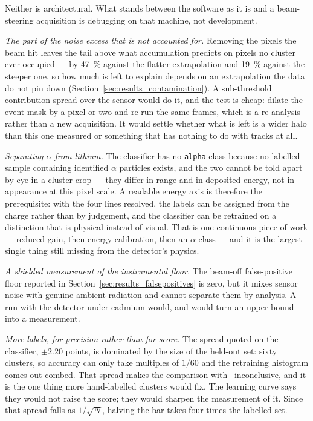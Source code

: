 \documentclass[a4paper,headsepline,oneside,11pt]{scrartcl}
\begin{document}
Neither is architectural. What stands between the software as it is and a
beam-steering acquisition is debugging on that machine, not development.

\emph{The part of the noise excess that is not accounted for.} Removing the
pixels the beam hit leaves the tail above what accumulation predicts on pixels
no cluster ever occupied --- by \SI{47}{\percent} against the flatter
extrapolation and \SI{19}{\percent} against the steeper one, so how much is
left to explain depends on an extrapolation the data do not pin down
(Section~\ref{sec:results_contamination}). A sub-threshold contribution spread
over the sensor would do it, and the test is cheap: dilate the event mask by a
pixel or two and re-run the same frames, which is a re-analysis rather than a
new acquisition. It would settle whether what is left is a wider halo than this
one measured or something that has nothing to do with tracks at all.

\emph{Separating $\alpha$ from lithium.} The classifier has no \texttt{alpha}
class because no labelled sample containing identified $\alpha$ particles
exists, and the two cannot be told apart by eye in a cluster crop --- they differ
in range and in deposited energy, not in appearance at this pixel scale. A
readable energy axis is therefore the prerequisite: with the four lines
resolved, the labels can be assigned from the charge rather than by judgement,
and the classifier can be retrained on a distinction that is physical instead of
visual. That is one continuous piece of work --- reduced gain, then energy
calibration, then an $\alpha$ class --- and it is the largest single thing still
missing from the detector's physics.

\emph{A shielded measurement of the instrumental floor.} The beam-off
false-positive floor reported in Section~\ref{sec:results_falsepositives} is
zero, but it mixes sensor noise with genuine ambient radiation and cannot
separate them by analysis. A run with the detector under cadmium would, and
would turn an upper bound into a measurement.

\emph{More labels, for precision rather than for score.} The spread quoted on
the classifier, $\pm 2.20$ points, is dominated by the size of the held-out set:
sixty clusters, so accuracy can only take multiples of $1/60$ and the retraining
histogram comes out combed. That spread makes the comparison
with~\cite{Filter2018} inconclusive, and it is the one thing
more hand-labelled clusters would fix. The learning curve says they would not
raise the score; they would sharpen the measurement of it. Since that spread falls as $1/\sqrt{N}$, halving
the bar takes four times the labelled set.
\end{document}
